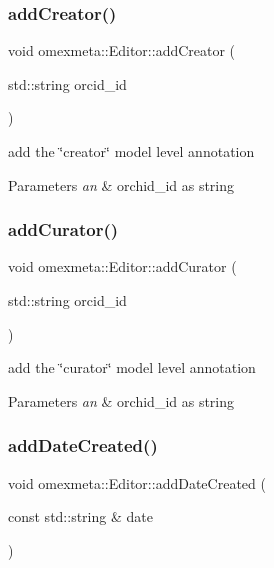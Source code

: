 \subsubsection{\texorpdfstring{add\+Creator()}{addCreator()}}
{\footnotesize\ttfamily void omexmeta\+::\+Editor\+::add\+Creator (\begin{DoxyParamCaption}\item[{std\+::string}]{orcid\+\_\+id }\end{DoxyParamCaption})}



add the \char`\"{}creator\char`\"{} model level annotation 


\begin{DoxyParams}{Parameters}
{\em an} & orchid\+\_\+id as string \\
\hline
\end{DoxyParams}
\mbox{\label{classomexmeta_1_1Editor_a8b83488faf68546733114acf54595b02}} 
\subsubsection{\texorpdfstring{add\+Curator()}{addCurator()}}
{\footnotesize\ttfamily void omexmeta\+::\+Editor\+::add\+Curator (\begin{DoxyParamCaption}\item[{std\+::string}]{orcid\+\_\+id }\end{DoxyParamCaption})}



add the \char`\"{}curator\char`\"{} model level annotation 


\begin{DoxyParams}{Parameters}
{\em an} & orchid\+\_\+id as string \\
\hline
\end{DoxyParams}
\mbox{\label{classomexmeta_1_1Editor_ae1b146f142ec10237f8edbecf0368f8e}} 
\subsubsection{\texorpdfstring{add\+Date\+Created()}{addDateCreated()}}
{\footnotesize\ttfamily void omexmeta\+::\+Editor\+::add\+Date\+Created (\begin{DoxyParamCaption}\item[{const std\+::string \&}]{date }\end{DoxyParamCaption})}



